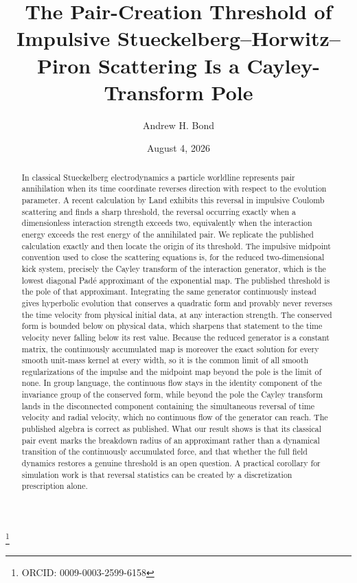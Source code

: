\documentclass[aps,prd,reprint,nofootinbib]{revtex4-2}
\begin{document}
\title{The Pair-Creation Threshold of Impulsive
Stueckelberg--Horwitz--Piron Scattering Is a Cayley-Transform Pole}

\author{Andrew H. Bond}
\thanks{ORCID: 0009-0003-2599-6158}
\date{August 4, 2026}

\begin{abstract}
In classical Stueckelberg electrodynamics a particle worldline represents
pair annihilation when its time coordinate reverses direction with respect
to the evolution parameter.  A recent calculation by Land exhibits this
reversal in impulsive Coulomb scattering and finds a sharp threshold, the
reversal occurring exactly when a dimensionless interaction strength
exceeds two, equivalently when the interaction energy exceeds the rest
energy of the annihilated pair.  We replicate the published calculation
exactly and then locate the origin of its threshold.  The impulsive
midpoint convention used to close the scattering equations is, for the
reduced two-dimensional kick system, precisely the Cayley transform of the
interaction generator, which is the lowest diagonal Pad\'e approximant of
the exponential map.  The published threshold is the pole of that
approximant.  Integrating the same generator continuously instead gives
hyperbolic evolution that conserves a quadratic form and provably never
reverses the time velocity from physical initial data, at any interaction
strength.  The conserved form is bounded below on physical data, which
sharpens that statement to the time velocity never falling below its rest
value.  Because the reduced generator is a constant matrix, the
continuously accumulated map is moreover the exact solution for every
smooth unit-mass kernel at every width, so it is the common limit of all
smooth regularizations of the impulse and the midpoint map beyond the pole
is the limit of none.  In group language, the continuous flow stays in the identity
component of the invariance group of the conserved form, while beyond the
pole the Cayley transform lands in the disconnected component containing
the simultaneous reversal of time velocity and radial velocity, which no
continuous flow of the generator can reach.  The published algebra is
correct as published.  What our result shows is that its classical pair
event marks the breakdown radius of an approximant rather than a
dynamical transition of the continuously accumulated force, and that
whether the full field dynamics restores a genuine threshold is an open
question.  A practical corollary for simulation work is that reversal
statistics can be created by a discretization prescription alone.
\end{abstract}
\end{document}
